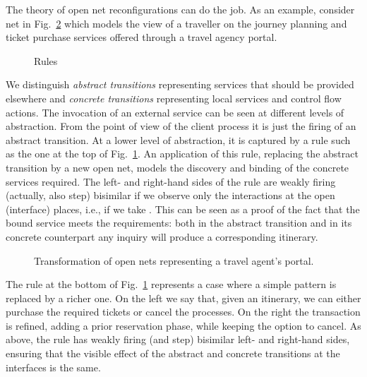 \documentclass{LMCS}
\begin{document}
The theory of open net reconfigurations can do the job.
As an example, consider net  in  Fig.~\ref{fi:portal}
which models the view of a traveller on the journey planning and
ticket purchase services offered through a travel agency portal.

\begin{figure}[t]
  \begin{center}
  \end{center}

  \caption{Rules}
  \label{fi:rules}
\end{figure}


We distinguish \emph{abstract transitions} representing services that
should be provided elsewhere and \emph{concrete transitions}
representing local services and control flow actions. The invocation
of an external service can be seen at different levels of
abstraction. From the point of view of the client process it is just
the firing of an abstract transition. At a lower level of abstraction,
it is captured by a rule such as the one at
the top of Fig.~\ref{fi:rules}. An application of this rule, replacing
the abstract transition by a new open net, models the discovery and
binding of the concrete services required.
The left- and right-hand sides of the rule are weakly firing (actually,
also step) bisimilar if we observe only the interactions at the open
(interface) places, i.e., if we take . This
can be seen as a proof of the fact that the bound service meets the
requirements: both in the abstract transition and in its concrete
counterpart any inquiry will produce a corresponding itinerary.

\begin{figure}[t]
  \begin{center}
  \end{center}

  \caption{Transformation of open nets representing a travel agent's portal.}
  \label{fi:portal}
\end{figure}

The rule at the bottom of Fig.~\ref{fi:rules} represents a case where
a simple pattern is replaced by a richer one. On the left we say that,
given an itinerary, we can either purchase the required tickets or
cancel the processes. On the right the transaction is refined, adding
a prior reservation phase, while keeping the option to cancel. As
above, the rule has weakly firing (and step) bisimilar left- and right-hand
sides, ensuring that the visible effect of the abstract and concrete
transitions at the interfaces is the same.
\end{document}

